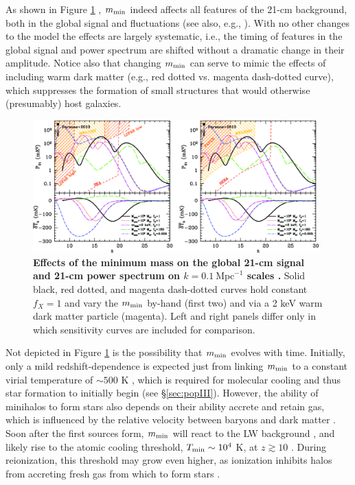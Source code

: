 As shown in Figure \ref{fig:mesinger2014_fig3} \cite{Mesinger2014}, $m_{\text{min}}$ indeed affects all features of the 21-cm background, both in the global signal and fluctuations (see also, e.g., \cite{Fialkov2017,Mirocha2015}). With no other changes to the model the effects are largely systematic, i.e., the timing of features in the global signal and power spectrum are shifted without a dramatic change in their amplitude. Notice also that changing $m_{\text{min}}$ can serve to mimic the effects of including warm dark matter (e.g., red dotted vs. magenta dash-dotted curve), which suppresses the formation of small structures that would otherwise (presumably) host galaxies.

\begin{figure}[]
\begin{center}
\includegraphics[width=0.98\textwidth]{Mirocha/mesinger2014_fig3.pdf}
\end{center}
\caption{{\bf Effects of the minimum mass on the global 21-cm signal and 21-cm power spectrum on $k=0.1 \ \mathrm{Mpc}^{-1}$ scales \cite{Mesinger2014}.} Solid black, red dotted, and magenta dash-dotted curves hold constant $f_X=1$ and vary the $m_{\text{min}}$ by-hand (first two) and via a 2 keV warm dark matter particle (magenta). Left and right panels differ only in which sensitivity curves are included for comparison.}
\label{fig:mesinger2014_fig3}
\end{figure}

Not depicted in Figure \ref{fig:mesinger2014_fig3} is the possibility that $m_{\text{min}}$ evolves with time. Initially, only a mild redshift-dependence is expected just from linking $m_{\text{min}}$ to a constant virial temperature of $\sim 500$ K \cite{Tegmark1997}, which is required for molecular cooling and thus star formation to initially begin (see \S\ref{sec:popIII}). However, the ability of minihalos to form stars also depends on their ability accrete and retain gas, which is influenced by the relative velocity between baryons and dark matter \cite{Tseliakhovich2010,Tseliakhovich2010,Fialkov2012}. Soon after the first sources form, $m_{\text{min}}$ will react to the LW background \cite{Haiman1997,Machacek2001,Visbal2014}, and likely rise to the atomic cooling threshold, $T_{\min} \sim 10^4$ K, at $z \gtrsim 10$ \cite{Trenti2009,Mebane2018}. During reionization, this threshold may grow even higher, as ionization inhibits halos from accreting fresh gas from which to form stars \cite{Gnedin2000,Noh2014,Yue2016}.


